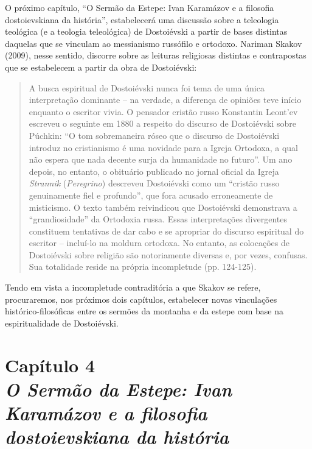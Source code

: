 O próximo capítulo, ``O Sermão da Estepe: Ivan Karamázov e a filosofia
dostoievskiana da história'', estabelecerá uma discussão sobre a
teleologia teológica (e a teologia teleológica) de Dostoiévski a partir
de bases distintas daquelas que se vinculam ao messianismo russófilo e
ortodoxo. Nariman Skakov (2009), nesse sentido, discorre sobre as
leituras religiosas distintas e contrapostas que se estabelecem a partir
da obra de Dostoiévski:

\begin{quote}
A busca espiritual de Dostoiévski nunca foi tema de uma única
interpretação dominante -- na verdade, a diferença de opiniões teve
início enquanto o escritor vivia. O pensador cristão russo Konstantin
Leont'ev escreveu o seguinte em 1880 a respeito do discurso de
Dostoiévski sobre Púchkin: ``O tom sobremaneira róseo que o discurso de
Dostoiévski introduz no cristianismo é uma novidade para a Igreja
Ortodoxa, a qual não espera que nada decente surja da humanidade no
futuro''. Um ano depois, no entanto, o obituário publicado no jornal
oficial da Igreja \emph{Strannik} (\emph{Peregrino}) descreveu
Dostoiévski como um ``cristão russo genuinamente fiel e profundo'', que
fora acusado erroneamente de misticismo. O texto também reivindicou que
Dostoiévski demonstrava a ``grandiosidade'' da Ortodoxia russa. Essas
interpretações divergentes constituem tentativas de dar cabo e se
apropriar do discurso espiritual do escritor -- incluí-lo na moldura
ortodoxa. No entanto, as colocações de Dostoiévski sobre religião são
notoriamente diversas e, por vezes, confusas. Sua totalidade reside na
própria incompletude (pp. 124-125).
\end{quote}

Tendo em vista a incompletude contraditória a que Skakov se refere,
procuraremos, nos próximos dois capítulos, estabelecer novas vinculações
histórico-filosóficas entre os sermões da montanha e da estepe com base
na espiritualidade de Dostoiévski.

\chapter*{Capítulo 4\\
\bigskip
\emph{O Sermão da Estepe: Ivan Karamázov e a filosofia dostoievskiana da
história}}


